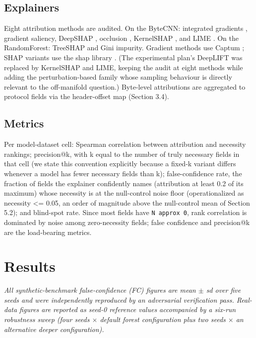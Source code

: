 \documentclass[journal]{IEEEtran}
\begin{document}
\subsection{Explainers}

Eight attribution methods are audited. On the ByteCNN: integrated
gradients \cite{sundararajan2017axiomatic}, gradient saliency, DeepSHAP
\cite{lundberg2017shap}, occlusion \cite{zeiler2014visualizing},
KernelSHAP \cite{lundberg2017shap}, and LIME \cite{ribeiro2016lime}. On
the RandomForest: TreeSHAP \cite{lundberg2017shap} and Gini impurity.
Gradient methods use Captum \cite{kokhlikyan2020captum}; SHAP variants
use the shap library \cite{shap-software}. (The experimental plan's
DeepLIFT \cite{shrikumar2017deeplift} was replaced by KernelSHAP and
LIME, keeping the audit at eight methods while adding the
perturbation-based family whose sampling behaviour is directly relevant
to the off-manifold question.) Byte-level attributions are aggregated to
protocol fields via the header-offset map (Section 3.4).

\subsection{Metrics}

Per model-dataset cell: Spearman correlation between attribution and
necessity rankings; precision@k, with k equal to the number of truly
necessary fields in that cell (we state this convention explicitly
because a fixed-k variant differs whenever a model has fewer necessary
fields than k); false-confidence rate, the fraction of fields the
explainer confidently names (attribution at least 0.2 of its maximum)
whose necessity is at the null-control noise floor (operationalized as
necessity \textless= 0.05, an order of magnitude above the null-control
mean of Section 5.2); and blind-spot rate. Since most fields have
\texttt{N\ approx\ 0}, rank correlation is dominated by noise among
zero-necessity fields; false confidence and precision@k are the
load-bearing metrics.

\section{Results}

\emph{All synthetic-benchmark false-confidence (FC) figures are mean $\pm$
sd over five seeds and were independently reproduced by an adversarial
verification pass. Real-data figures are reported as seed-0 reference
values accompanied by a six-run robustness sweep (four seeds $\times$ default
forest configuration plus two seeds $\times$ an alternative deeper
configuration).}
\end{document}
